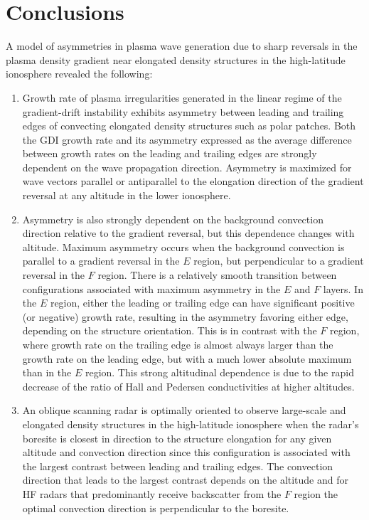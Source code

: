 \section{Conclusions}
\label{sec:p2conclusions}
A model of asymmetries in plasma wave generation due to sharp reversals in the plasma density gradient near elongated density structures in the high-latitude ionosphere revealed the following:
 
\begin{enumerate}
	\item Growth rate of plasma irregularities generated in the linear regime of the gradient-drift instability exhibits asymmetry between leading and trailing edges of convecting elongated density structures such as polar patches.  Both the GDI growth rate and its asymmetry expressed as the average difference between growth rates on the leading and trailing edges are strongly dependent on the wave propagation direction. Asymmetry is maximized for wave vectors parallel or antiparallel to the elongation direction of the gradient reversal at any altitude in the lower ionosphere.
	\item Asymmetry is also strongly dependent on the background convection direction relative to the gradient reversal, but this dependence changes with altitude. Maximum asymmetry occurs when the background convection is parallel to a gradient reversal in the \(E\) region, but perpendicular to a gradient reversal in the \(F\) region. There is a relatively smooth transition between configurations associated with maximum asymmetry in the \(E\) and \(F\) layers. In the \(E\) region, either the leading or trailing edge can have significant positive (or negative) growth rate, resulting in the asymmetry favoring either edge, depending on the structure orientation. This is in contrast with the \(F\) region, where growth rate on the trailing edge is almost always larger than the growth rate on the leading edge, but with a much lower absolute maximum than in the \(E\) region. This strong altitudinal dependence is due to the rapid decrease of the ratio of Hall and Pedersen conductivities at higher altitudes.
	\item An oblique scanning radar is optimally oriented to observe large-scale and elongated density structures in the high-latitude ionosphere when the radar's boresite is closest in direction to the structure elongation for any given altitude and convection direction since this configuration is associated with the largest contrast between leading and trailing edges. The convection direction that leads to the largest contrast depends on the altitude and for HF radars that predominantly receive backscatter from the \(F\) region the optimal convection direction is perpendicular to the boresite.
\end{enumerate}






